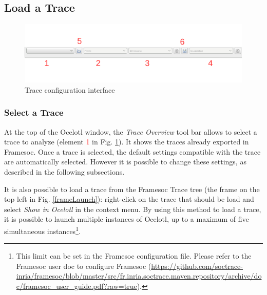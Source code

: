 \documentclass[twoside]{article}
\begin{document}
\begin{sloppypar}
\subsection{Load a Trace}
\begin{figure}[h!]
	\centering
	\includegraphics[width=\textwidth]{images/traceSelection_labeled.pdf}
	\caption{Trace configuration interface}
	\label{traceConf}
\end{figure}

\subsubsection{Select a Trace}

At the top of the Ocelotl window, the \textit{Trace Overview} tool bar allows to select a trace to analyze (element \textcolor{red}{1} in Fig. \ref{traceConf}). It shows the traces already exported in Framesoc. Once a trace is selected, the default settings compatible with the trace are automatically selected. However it is possible to change these settings, as described in the following subsections. 

It is also possible to load a trace from the Framesoc Trace tree (the frame on the top left in Fig. \ref{frameLaunch}): right-click on the trace that should be load and select \textit{Show in Ocelotl} in the context menu. By using this method to load a trace, it is possible to launch multiple instances of Ocelotl, up to a maximum of five simultaneous instances\footnote{This limit can be set in the Framesoc configuration file. Please refer to the Framesoc user doc to configure Framesoc (\url{https://github.com/soctrace-inria/framesoc/blob/master/src/fr.inria.soctrace.maven.repository/archive/doc/framesoc_user_guide.pdf?raw=true}).}.


\end{sloppypar}
\end{document}
